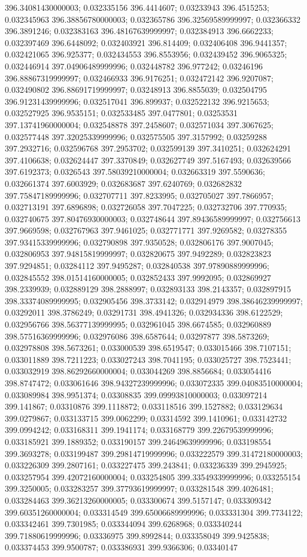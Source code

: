 396.34081430000003; 0.032335156 396.4414607; 0.03233943 396.4515253; 0.032345963 396.38856780000003; 0.032365786 396.32569589999997; 0.032366332 396.3891246; 0.032383163 396.48167639999997; 0.032384913 396.6662233; 0.032397469 396.6448092; 0.032403921 396.814409; 0.032406408 396.9441357; 0.032421065 396.925377; 0.032434553 396.8553956; 0.032439452 396.9065325; 0.032446914 397.04906489999996; 0.032448782 396.977242; 0.03246196 396.88867319999997; 0.032466933 396.9176251; 0.032472142 396.9207087; 0.032490802 396.88691719999997; 0.03248913 396.8855039; 0.032504795 396.91231439999996; 0.032517041 396.899937; 0.032522132 396.9215653; 0.032527925 396.9535151; 0.032533485 397.0477801; 0.03253531 397.13741960000004; 0.032548878 397.2458607; 0.032571034 397.3067625; 0.032577448 397.32025339999996; 0.032575505 397.3157992; 0.03259288 397.2932716; 0.032596768 397.2953702; 0.032599139 397.3410251; 0.032624291 397.4106638; 0.032624447 397.3370849; 0.032627749 397.5167493; 0.032639566 397.6192373; 0.0326543 397.58039210000004; 0.032663319 397.5590636; 0.032661374 397.6003929; 0.032683687 397.6240769; 0.032682832 397.75847189999996; 0.032707711 397.8233995; 0.032705027 397.7866957; 0.032713191 397.6896898; 0.032726058 397.7047225; 0.032732706 397.770935; 0.032740675 397.80476930000003; 0.032748644 397.89436589999997; 0.032756613 397.9669598; 0.032767963 397.9461025; 0.032771771 397.9269582; 0.03278355 397.93415339999996; 0.032790898 397.9350528; 0.032806176 397.9007045; 0.032806953 397.94815819999997; 0.032820675 397.9492289; 0.032823823 397.9294851; 0.03284112 397.9495287; 0.032840538 397.97890889999996; 0.032845552 398.01514160000005; 0.032852433 397.9992095; 0.032869927 398.2339939; 0.032889129 398.2888997; 0.032893133 398.2143357; 0.032897915 398.33374089999995; 0.032905456 398.3733142; 0.032914979 398.38646239999997; 0.03292011 398.3786249; 0.03291731 398.4941326; 0.032934336 398.6122529; 0.032956766 398.56377139999995; 0.032961045 398.6674585; 0.032960889 398.57516369999996; 0.032976086 398.6587644; 0.03297877 398.5873269; 0.032978808 398.5673261; 0.033000539 398.6519547; 0.033015466 398.7107151; 0.033011889 398.7211223; 0.033027243 398.7041195; 0.033025727 398.7523441; 0.033032919 398.86292660000004; 0.033044269 398.8856684; 0.033054416 398.8747472; 0.033061646 398.94327239999996; 0.033072335 399.04083510000004; 0.033089984 398.9951374; 0.03308835 399.09993810000003; 0.033097214 399.141867; 0.03310876 399.1118872; 0.033118516 399.1527882; 0.033129634 399.0279867; 0.033133715 399.0062299; 0.03314592 399.1410961; 0.033142732 399.0994242; 0.033168311 399.1941174; 0.033168779 399.22679539999996; 0.033185921 399.1889352; 0.033190157 399.24649639999996; 0.033198554 399.3693278; 0.033199487 399.29814719999996; 0.033222579 399.31472180000003; 0.033226309 399.2807161; 0.033227475 399.243841; 0.033236339 399.2945925; 0.033257954 399.42072160000004; 0.033254805 399.33549339999996; 0.033255154 399.3250005; 0.033283257 399.37793619999997; 0.033281548 399.4026481; 0.033284463 399.36213260000005; 0.033300674 399.5157147; 0.033309342 399.60351260000004; 0.033314549 399.65006689999996; 0.033331304 399.7734122; 0.033342461 399.7301985; 0.033344094 399.6268968; 0.033340244 399.71880619999996; 0.03336975 399.8992844; 0.033358049 399.9425838; 0.033374453 399.9500787; 0.033386931 399.9366306; 0.03340147 